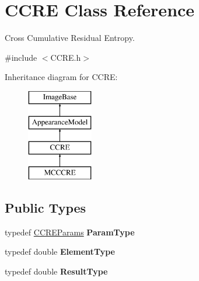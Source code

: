 \hypertarget{classCCRE}{\section{C\-C\-R\-E Class Reference}
\label{classCCRE}
}


Cross Cumulative Residual Entropy.  




{\ttfamily \#include $<$C\-C\-R\-E.\-h$>$}

Inheritance diagram for C\-C\-R\-E\-:\begin{figure}[H]
\begin{center}
\leavevmode
\includegraphics[height=4.000000cm]{classCCRE}
\end{center}
\end{figure}
\subsection*{Public Types}
\begin{DoxyCompactItemize}
\item 
\hypertarget{classCCRE_a3005dd4c7093c54a066347df2ecb7431}{typedef \hyperlink{structCCREParams}{C\-C\-R\-E\-Params} {\bfseries Param\-Type}}\label{classCCRE_a3005dd4c7093c54a066347df2ecb7431}

\item 
\hypertarget{classCCRE_ac55a39adcb2c002aff5260fa78f96b53}{typedef double {\bfseries Element\-Type}}\label{classCCRE_ac55a39adcb2c002aff5260fa78f96b53}

\item 
\hypertarget{classCCRE_a55c3a42bfa3b8ebcccd9c51e73f36394}{typedef double {\bfseries Result\-Type}}\label{classCCRE_a55c3a42bfa3b8ebcccd9c51e73f36394}

\end{DoxyCompactItemize}
